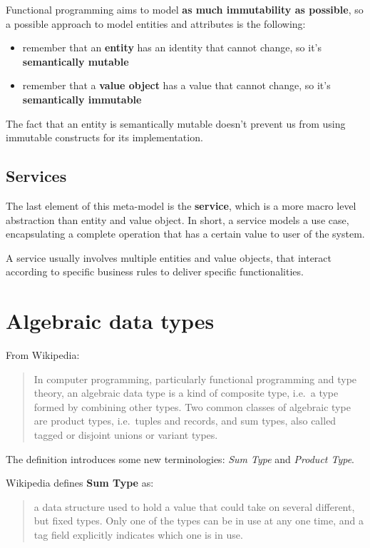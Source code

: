 Functional programming aims to model \textbf{as much immutability as
possible}, so a possible approach to model entities and attributes is
the following:

\begin{itemize}
\itemsep1pt\parskip0pt
\item
  remember that an \textbf{entity} has an identity that cannot change,
  so it's \textbf{semantically mutable}
\item
  remember that a \textbf{value object} has a value that cannot change,
  so it's \textbf{semantically immutable}
\end{itemize}

The fact that an entity is semantically mutable doesn't prevent us from
using immutable constructs for its implementation.

\subsection{Services}\label{services}

The last element of this meta-model is the \textbf{service}, which is a
more macro level abstraction than entity and value object. In short, a
service models a use case, encapsulating a complete operation that has a
certain value to user of the system.

A service usually involves multiple entities and value objects, that
interact according to specific business rules to deliver specific
functionalities.


\section{Algebraic data types}\label{algebraic-data-types}

From Wikipedia:

\begin{quote}
In computer programming, particularly functional programming and type
theory, an algebraic data type is a kind of composite type, i.e.~a type
formed by combining other types. Two common classes of algebraic type
are product types, i.e.~tuples and records, and sum types, also called
tagged or disjoint unions or variant types.
\end{quote}

The definition introduces some new terminologies: \emph{Sum Type} and
\emph{Product Type}.

Wikipedia defines \textbf{Sum Type} as:

\begin{quote}
a data structure used to hold a value that could take on several
different, but fixed types. Only one of the types can be in use at any
one time, and a tag field explicitly indicates which one is in use.
\end{quote}

